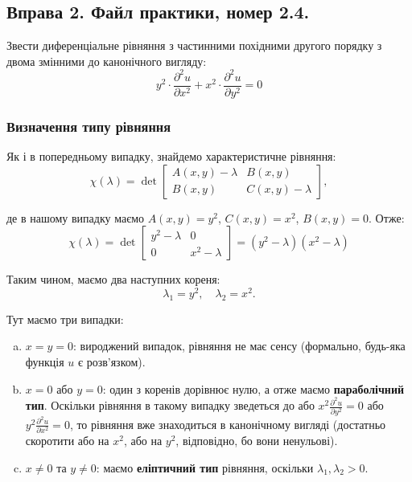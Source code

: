 \documentclass{hw_template}
\begin{document}
\subsection{Вправа 2. Файл практики, номер 2.4.}

\begin{problem}
    Звести диференціальне рівняння з частинними похідними другого порядку з двома змінними до канонічного вигляду:
    \begin{equation*}
        y^2 \cdot \frac{\partial^2 u}{\partial x^2} + x^2 \cdot \frac{\partial^2 u}{\partial y^2} = 0
    \end{equation*}
\end{problem}

\subsubsection{Визначення типу рівняння}

Як і в попередньому випадку, знайдемо характеристичне рівняння:
\begin{equation*}
    \chi(\lambda) = \det \begin{bmatrix}
        A(x,y) - \lambda & B(x,y) \\
        B(x,y) & C(x,y) - \lambda
    \end{bmatrix},
\end{equation*}

де в нашому випадку маємо $A(x,y) = y^2$, $C(x,y) = x^2$, $B(x,y)=0$. Отже:
\begin{equation*}
    \chi(\lambda) = \det\begin{bmatrix}
        y^2 - \lambda & 0 \\
        0 & x^2 - \lambda
    \end{bmatrix} = (y^2 - \lambda)(x^2 - \lambda)
\end{equation*}

Таким чином, маємо два наступних кореня:
\begin{equation*}
    \lambda_1 = y^2, \quad \lambda_2 = x^2.
\end{equation*}

Тут маємо три випадки:
\begin{enumerate}[(a)]
    \item $x=y=0$: вироджений випадок, рівняння не має сенсу (формально, будь-яка функція $u$ є розв'язком).
    \item $x=0$ або $y=0$: один з коренів дорівнює нулю, а отже маємо \textbf{параболічний тип}. Оскільки рівняння в такому випадку зведеться до або $x^2 \frac{\partial^2 u}{\partial y^2}=0$ або $y^2 \frac{\partial^2 u}{\partial x^2} = 0$, то рівняння вже знаходиться в канонічному вигляді (достатньо скоротити або на $x^2$, або на $y^2$, відповідно, бо вони ненульові).
    \item $x \neq 0$ та $y \neq 0$: маємо \textbf{еліптичний тип} рівняння, оскільки $\lambda_1, \lambda_2 > 0$.  
\end{enumerate}
\end{document}
